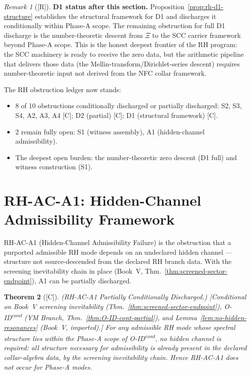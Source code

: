 \documentclass[12pt,oneside]{amsbook}
\theoremstyle{plain}
\newtheorem{theorem}{Theorem}[section]
\theoremstyle{definition}
\theoremstyle{remark}
\newtheorem{remark}[theorem]{Remark}
\newcommand{\status}[1]{\textup{[#1]}}
\begin{document}
\begin{remark}[\status{R}]\label{rem:rh-d1-status}
\textbf{D1 status after this section.}
Proposition~\ref{prop:rh-d1-structure} establishes the structural
framework for D1 and discharges it conditionally within Phase-A
scope. The remaining obstruction for full D1 discharge is the
number-theoretic descent from $\Xi$ to the SCC carrier
framework beyond Phase-A scope. This is the honest deepest
frontier of the RH program: the SCC machinery is ready to
receive the zero data, but the arithmetic pipeline that delivers
those data (the Mellin-transform/Dirichlet-series descent)
requires number-theoretic input not derived from the NFC collar
framework.

The RH obstruction ledger now stands:
\begin{itemize}
 \item 8 of 10 obstructions conditionally discharged or
 partially discharged: S2, S3, S4, A2, A3, A4 [C]; D2
 (partial) [C]; D1 (structural framework) [C].
 \item 2 remain fully open: S1 (witness assembly), A1
 (hidden-channel admissibility).
 \item The deepest open burden: the number-theoretic zero
 descent (D1 full) and witness construction (S1).
\end{itemize}
\end{remark}

\section{RH-AC-A1: Hidden-Channel Admissibility Framework}
\label{sec:rh-a1}

RH-AC-A1 (Hidden-Channel Admissibility Failure) is the
obstruction that a purported admissible RH mode depends on an
undeclared hidden channel --- structure not source-descended
from the declared RH branch data. With the screening
inevitability chain in place (Book~V,
Thm.~\ref{thm:screened-sector-endpoint}), A1 can be partially
discharged.

\begin{theorem}[\status{C}]\label{thm:rh-ac-a1}
\textup{(RH-AC-A1 Partially Conditionally Discharged.)}
\textup{[Conditional on Book~V screening inevitability
(Thm.~\ref{thm:screened-sector-endpoint}), O-ID\textsuperscript{cont}
(YM Branch, Thm.~\ref{thm:O-ID-cont-partial}), and
Lemma~\ref{lem:no-hidden-resonances} (Book~V, imported).]}
For any admissible RH mode whose spectral structure lies
within the Phase-A scope of O-ID\textsuperscript{cont}, no
hidden channel is required: all structure necessary for
admissibility is already present in the declared collar-algebra
data, by the screening inevitability chain. Hence RH-AC-A1
does not occur for Phase-A modes.
\end{theorem}
\end{document}
